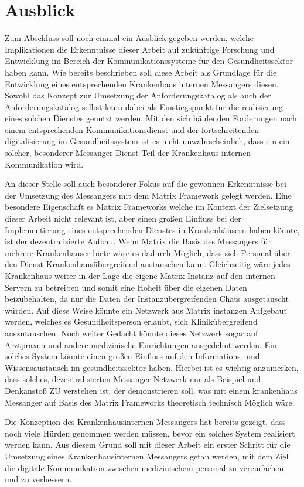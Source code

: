 \section{Ausblick}\label{chapter:fazit}
Zum Abschluss soll noch einmal ein Ausblick gegeben werden, welche Implikationen die Erkenntnisse dieser Arbeit auf zukünftige Forschung und Entwicklung im Bereich der Kommunikationssysteme für den Gesundheitssektor haben kann. Wie bereits beschrieben soll diese Arbeit als Grundlage für die Entwicklung eines entsprechenden Krankenhaus internen Messangers diesen. Sowohl das Konzept zur Umsetzung der Anforderungskatalog als auch der Anforderungskatalog selbst kann dabei als Einstiegspunkt für die realisierung eines solchen Dienstes genutzt werden. Mit den sich häufenden Forderungen nach einem entsprechenden Kommunikationsdienst und der fortschreitenden digitalisierung im Gesundheitssystem ist es nicht unwahrscheinlich, dass ein ein solcher, besonderer Messanger Dienst Teil der Krankenhaus internen Kommunikation wird. 

An dieser Stelle soll auch besonderer Fokus auf die gewonnen Erkenntnisse bei der Umsetzung des Messangers mit dem Matrix Framework gelegt werden. Eine besondere Eigenschaft es Matrix Frameworks welche im Kontext der Zielsetzung dieser Arbeit nicht relevant ist, aber einen großen Einfluss bei der Implementierung eines entsprechenden Dienstes in Krankenhäusern haben könnte, ist der dezentralisierte Aufbau. Wenn Matrix die Basis des Messangers für mehrere Krankenhäuser biete wäre es dadurch Möglich, dass sich Personal über den Dienst Krankenhausübergreifend austauschen kann. Gleichzeitig wäre jedes Krankenhaus weiter in der Lage die eigene Matrix Instanz auf den internen Servern zu betreiben und somit eine Hoheit über die eigenen Daten beizubehalten, da nur die Daten der Instanzübergreifenden Chats ausgetauscht würden. Auf diese Weise könnte ein Netzwerk aus Matrix instanzen Aufgebaut werden, welches es Gesundheitsperson erlaubt, sich Klinikübergreifend auszutauschen. Noch weiter Gedacht könnte dieses Netzwerk sogar auf Arztpraxen und andere medizinische Einrichtungen ausgedehnt werden. Ein solches System könnte einen großen Einfluss auf den Informations- und Wissensaustausch im gesundheitssektor haben. Hierbei ist es wichtig anzumerken, dass solches, dezentralisierten Messanger Netzwerk nur als Beispiel und Denkanstoß ZU verstehen ist, der demonstrieren soll, was mit einem krankenhaus Messanger auf Basis des Matrix Frameworks theoretisch technisch Möglich wäre. 

Die Konzeption des Krankenhausinternen Messangers hat bereits gezeigt, dass noch viele Hürden genommen werden müssen, bevor ein solches System realisiert werden kann. Aus diesem Grund soll mit dieser Arbeit ein erster Schritt für die Umsetzung eines Krankenhausinternen Messangers getan werden, mit dem Ziel die digitale Kommunikation zwischen medizinischem personal zu vereinfachen und zu verbessern. 


